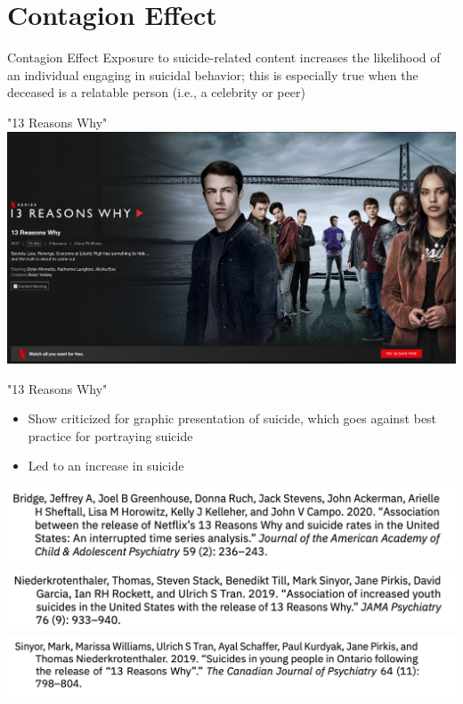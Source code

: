 \documentclass[nobackground,dvipsnames,table]{beamer}
\begin{document}
\section{Contagion Effect}

\begin{frame}{Contagion Effect}
    \large
    Exposure to suicide-related content increases the likelihood of an individual engaging in suicidal behavior; this is especially true when the deceased is a relatable person (i.e., a celebrity or peer)
\end{frame}

\begin{frame}{"13 Reasons Why"}
    \includegraphics[width=\textwidth]{13-reasons-why-netflix}
\end{frame}

\begin{frame}{"13 Reasons Why"}
    \begin{itemize}
        \item Show criticized for graphic presentation of suicide, which goes against best practice for portraying suicide
        \item Led to an increase in suicide
    \end{itemize}
    \includegraphics[width=\textwidth]{13-reasons-why-study-1}
    \includegraphics[width=\textwidth]{13-reasons-why-study-2}
    \includegraphics[width=\textwidth]{13-reasons-why-study-3}
\end{frame}
\end{document}
